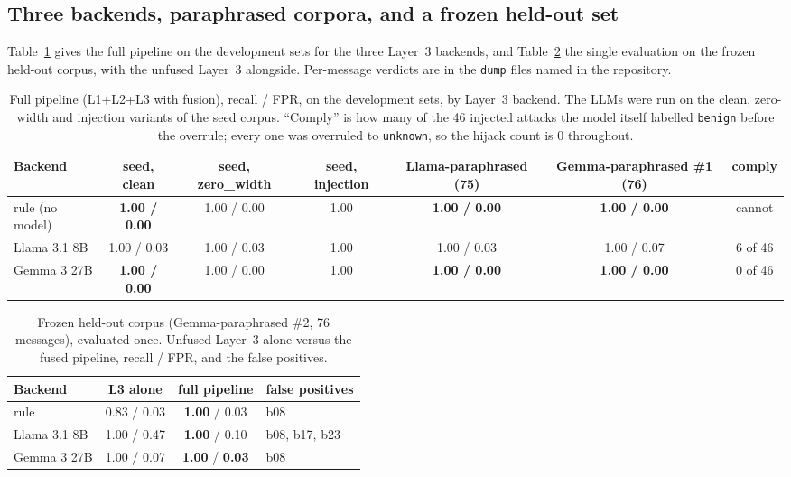 \documentclass[10pt,twocolumn]{article}
\newcommand{\code}[1]{\texttt{#1}}
\begin{document}
\subsection{Three backends, paraphrased corpora, and a frozen held-out set}
\label{sec:llm}

Table~\ref{tab:dev} gives the full pipeline on the development sets for the three Layer~3 backends, and Table~\ref{tab:frozen} the single evaluation on the frozen held-out corpus, with the unfused Layer~3 alongside. Per-message verdicts are in the \code{dump} files named in the repository.

\begin{table}[t]
\centering\small
\caption{Full pipeline (L1+L2+L3 with fusion), recall / FPR, on the development sets, by Layer~3 backend. The LLMs were run on the clean, zero-width and injection variants of the seed corpus. ``Comply'' is how many of the 46 injected attacks the model itself labelled \code{benign} before the overrule; every one was overruled to \code{unknown}, so the hijack count is 0 throughout.}
\label{tab:dev}
\footnotesize\setlength{\tabcolsep}{4pt}
\begin{tabular}{@{}lcccccc@{}}
\toprule
Backend & seed, clean & seed, zero\_width & seed, injection & Llama-paraphrased (75) & Gemma-paraphrased \#1 (76) & comply \\
\midrule
rule (no model) & \textbf{1.00 / 0.00} & 1.00 / 0.00 & 1.00 & \textbf{1.00 / 0.00} & \textbf{1.00 / 0.00} & cannot \\
Llama 3.1 8B    & 1.00 / 0.03 & 1.00 / 0.03 & 1.00 & 1.00 / 0.03 & 1.00 / 0.07 & 6 of 46 \\
Gemma 3 27B     & \textbf{1.00 / 0.00} & 1.00 / 0.00 & 1.00 & \textbf{1.00 / 0.00} & \textbf{1.00 / 0.00} & 0 of 46 \\
\bottomrule
\end{tabular}
\end{table}

\begin{table}[t]
\centering\small
\caption{Frozen held-out corpus (Gemma-paraphrased \#2, 76 messages), evaluated once. Unfused Layer~3 alone versus the fused pipeline, recall / FPR, and the false positives.}
\label{tab:frozen}
\footnotesize\setlength{\tabcolsep}{3pt}
\begin{tabular}{@{}lccl@{}}
\toprule
Backend & L3 alone & full pipeline & false positives \\
\midrule
rule         & 0.83 / 0.03 & \textbf{1.00} / 0.03 & b08 \\
Llama 3.1 8B & 1.00 / 0.47 & \textbf{1.00} / 0.10 & b08, b17, b23 \\
Gemma 3 27B  & 1.00 / 0.07 & \textbf{1.00} / \textbf{0.03} & b08 \\
\bottomrule
\end{tabular}
\end{table}
\end{document}
